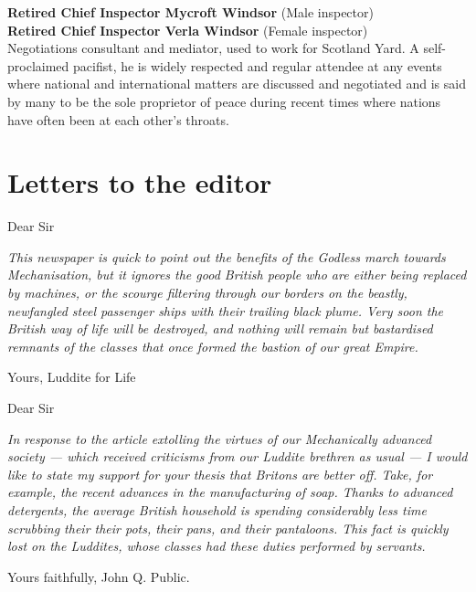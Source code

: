 \textbf{Retired Chief Inspector Mycroft Windsor} (Male inspector)\\
\textbf{Retired Chief Inspector Verla Windsor} (Female inspector)\\
Negotiations consultant and mediator, used to work for Scotland Yard. A
self-proclaimed pacifist, he is widely respected and regular attendee at
any events where national and international matters are discussed and
negotiated and is said by many to be the sole proprietor of peace during
recent times where nations have often been at each other's throats.

\section{Letters to the editor}\label{letters-to-the-editor}

Dear Sir

\emph{This newspaper is quick to point out the benefits of the Godless
march towards Mechanisation, but it ignores the good British people who
are either being replaced by machines, or the scourge filtering through
our borders on the beastly, newfangled steel passenger ships with their
trailing black plume. Very soon the British way of life will be
destroyed, and nothing will remain but bastardised remnants of the
classes that once formed the bastion of our great Empire.}

Yours, Luddite for Life

Dear Sir

\emph{In response to the article extolling the virtues of our
Mechanically advanced society --- which received criticisms from our
Luddite brethren as usual --- I would like to state my support for your
thesis that Britons are better off. Take, for example, the recent
advances in the manufacturing of soap. Thanks to advanced detergents,
the average British household is spending considerably less time
scrubbing their their pots, their pans, and their pantaloons. This fact
is quickly lost on the Luddites, whose classes had these duties
performed by servants.}

Yours faithfully, John Q. Public.
